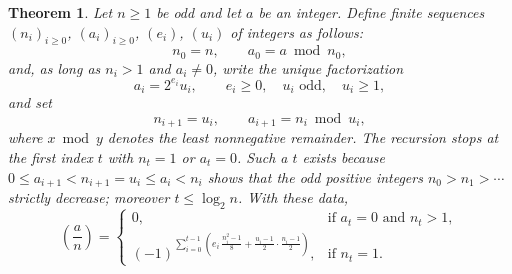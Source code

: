 \documentclass[11pt]{article}
\theoremstyle{ntstyle}
\newtheorem{theorem}{Theorem}[subsection]
\newcommand{\leg}[2]{\left(\frac{#1}{#2}\right)}
\begin{document}
\begin{theorem}\label{thm:7.6.3} Let $n \ge 1$ be odd and let $a$ be an
  integer. Define finite sequences $(n_i)_{i \ge 0}$, $(a_i)_{i \ge 0}$,
  $(e_i)$, $(u_i)$ of integers as follows:
  \[
    n_0 = n, \qquad a_0 = a \bmod n_0,
  \]
  and, as long as $n_i > 1$ and $a_i \neq 0$, write the unique
  factorization
  \[
    a_i = 2^{e_i}u_i, \qquad e_i \ge 0, \quad u_i \text{ odd}, \quad u_i
    \ge 1,
  \]
  and set
  \[
    n_{i+1} = u_i, \qquad a_{i+1} = n_i \bmod u_i,
  \]
  where $x \bmod y$ denotes the least nonnegative remainder. The
  recursion stops at the first index $t$ with $n_t = 1$ or $a_t = 0$.
  Such a $t$ exists because $0 \le a_{i+1} < n_{i+1} = u_i \le a_i < n_i$ shows that the odd positive integers
  $n_0 > n_1 > \cdots$
  strictly decrease; moreover $t \le \log_2 n$. With these data,
  \[
    \leg{a}{n} = \begin{cases} 0, & \text{if } a_t = 0 \text{ and } n_t >
                  1,                                                        \\[4pt] \displaystyle (-1)^{\sum_{i=0}^{t-1}\left(e_i\,\frac{n_i^{2}
                                                                                        - 1}{8} + \frac{u_i - 1}{2}\cdot\frac{n_i - 1}{2}\right)}, & \text{if
                                                                                                                                                   } n_t = 1.\end{cases}
  \]
  \end{theorem}
\end{document}
